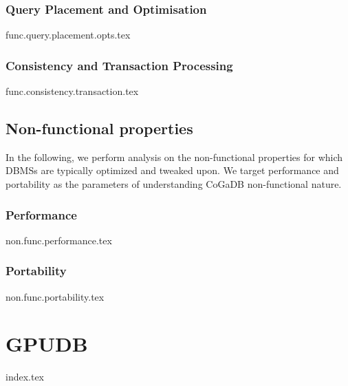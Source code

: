 \documentclass[a4paper, 11pt]{article}
\begin{document}
\subsubsection*{Query Placement and Optimisation}
{func.query.placement.opts.tex}

\subsubsection*{Consistency and Transaction Processing}
{func.consistency.transaction.tex}

\subsection*{Non-functional properties}
In the following, we perform analysis on the non-functional properties for which DBMSs are typically optimized and tweaked upon. We target performance and portability as the parameters of understanding CoGaDB non-functional nature.
\subsubsection*{Performance}
{non.func.performance.tex}

\subsubsection*{Portability}
{non.func.portability.tex}

\section*{GPUDB}
{index.tex}

\printbibliography
\end{document}
